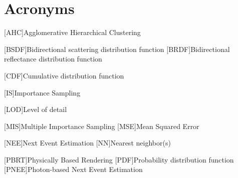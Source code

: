 \newpage
\section*{Acronyms}

\begin{acronym}[ECU]


[AHC]{Agglomerative Hierarchical Clustering}


[BSDF]{Bidirectional scattering distribution function}
[BRDF]{Bidirectional reflectance distribution function}

[CDF]{Cumulative distribution function}

[IS]{Importance Sampling}

[LOD]{Level of detail}

[MIS]{Multiple Importance Sampling}
[MSE]{Mean Squared Error}

[NEE]{Next Event Estimation}
[NN]{Nearest neighbor(s)}

[PBRT]{Physically Based Rendering}
[PDF]{Probability distribution function}
[PNEE]{Photon-based Next Event Estimation}


\end{acronym}
